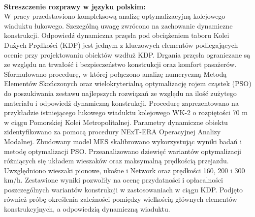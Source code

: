 \begin{myfont}
	\pagebreak[4]
	
	\thispagestyle{plain}
	\noindent
	\\
	\textbf{Streszczenie rozprawy w języku polskim:}\\
	W pracy przedstawiono kompleksową analizę optymalizacyjną kolejowego wiaduktu łukowego. Szczególną uwagę zwrócono na zachowanie dynamiczne konstrukcji. Odpowiedź dynamiczna przęsła pod obciążeniem taboru Kolei Dużych Prędkości (KDP) jest jednym z kluczowych elementów podlegających ocenie przy projektowaniu obiektów wzdłuż KDP. Drgania przęsła ograniczane są ze względu na trwałość i bezpieczeństwo konstrukcji oraz komfort pasażerów. Sformułowano procedurę, w której połączono analizę numeryczną Metodą Elementów Skończonych oraz wielokryterialną optymalizację rojem cząstek (PSO) do poszukiwania zestawu najlepszych rozwiązań ze względu na ilość zużytego materiału i odpowiedź dynamiczną konstrukcji. Procedurę zaprezentowano na przykładzie istniejącego łukowego wiaduktu kolejowego WK-2 o rozpiętości 70 m w ciągu Pomorskiej Kolei Metropolitalnej. Parametry dynamiczne obiektu zidentyfikowano za pomocą procedury NExT-ERA Operacyjnej Analizy Modalnej. Zbudowany model MES skalibrowano wykorzystując wyniki badań i metodę optymalizacji PSO. Przeanalizowano dziewięć wariantów optymalizacji różniących się układem wieszaków oraz maksymalną prędkością przejazdu. Uwzględniono wieszaki pionowe, ukośne i Network oraz prędkości 160, 200 i 300 km/h. Zestawione wyniki pozwoliły na ocenę przydatności i opłacalności poszczególnych wariantów konstrukcji w zastosowaniach w ciągu KDP. Podjęto również próbę określenia zależności pomiędzy wielkością głównych elementów konstrukcyjnych, a odpowiedzią dynamiczną wiaduktu.
	

\end{myfont}
